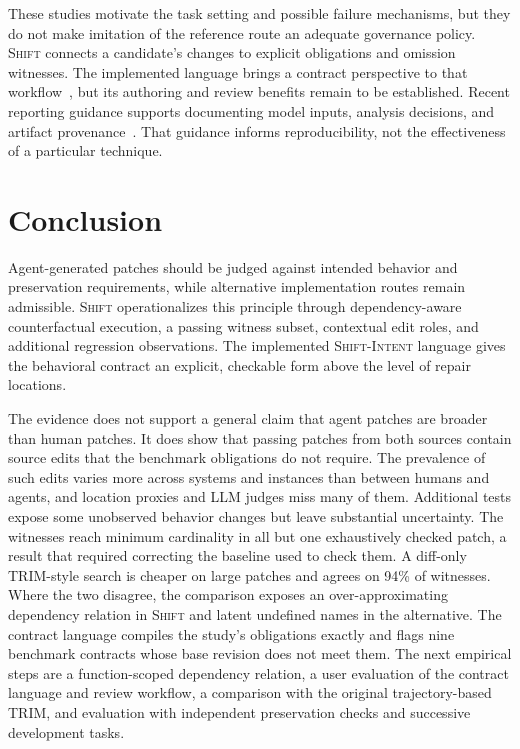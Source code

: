 \documentclass[a4paper,fleqn]{cas-sc}
\newcommand{\tool}{\textsc{Shift}}
\newcommand{\dsl}{\textsc{Shift-Intent}}
\begin{document}
These studies motivate the task setting and possible failure mechanisms, but they do not make imitation of the reference route an adequate governance policy. \tool{} connects a candidate's changes to explicit obligations and omission witnesses. The implemented language brings a contract perspective to that workflow~\citep{meyer1992dbc}, but its authoring and review benefits remain to be established. Recent reporting guidance supports documenting model inputs, analysis decisions, and artifact provenance~\citep{baltes2027guidelines}. That guidance informs reproducibility, not the effectiveness of a particular technique.

\section{Conclusion}\label{sec:conclusion}

Agent-generated patches should be judged against intended behavior and preservation requirements, while alternative implementation routes remain admissible. \tool{} operationalizes this principle through dependency-aware counterfactual execution, a passing witness subset, contextual edit roles, and additional regression observations. The implemented \dsl{} language gives the behavioral contract an explicit, checkable form above the level of repair locations.

The evidence does not support a general claim that agent patches are broader than human patches. It does show that passing patches from both sources contain source edits that the benchmark obligations do not require. The prevalence of such edits varies more across systems and instances than between humans and agents, and location proxies and LLM judges miss many of them. Additional tests expose some unobserved behavior changes but leave substantial uncertainty. The witnesses reach minimum cardinality in all but one exhaustively checked patch, a result that required correcting the baseline used to check them. A diff-only TRIM-style search is cheaper on large patches and agrees on 94\% of witnesses. Where the two disagree, the comparison exposes an over-approximating dependency relation in \tool{} and latent undefined names in the alternative. The contract language compiles the study's obligations exactly and flags nine benchmark contracts whose base revision does not meet them. The next empirical steps are a function-scoped dependency relation, a user evaluation of the contract language and review workflow, a comparison with the original trajectory-based TRIM, and evaluation with independent preservation checks and successive development tasks.
\end{document}
